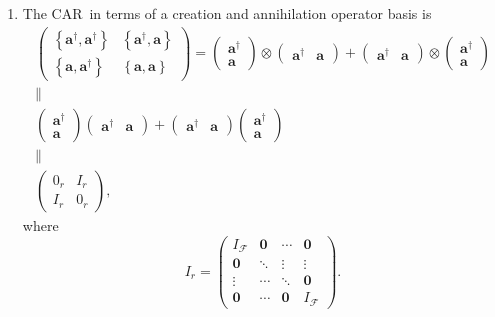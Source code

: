 \documentclass[aps,preprint]{revtex4}
\begin{document}
\begin{enumerate}
\begin{enumerate}
\item The CAR\ in terms of a creation and annihilation operator basis is 
\begin{gather}
\left( 
\begin{array}{cc}
\left\{ \boldsymbol{a}^{\dagger },\boldsymbol{a}^{\dagger }\right\} & 
\left\{ \boldsymbol{a}^{\dagger },\boldsymbol{a}\right\} \\ 
\left\{ \boldsymbol{a},\boldsymbol{a}^{\dagger }\right\} & \left\{ 
\boldsymbol{a},\boldsymbol{a}\right\}%
\end{array}%
\right) =\left( 
\begin{array}{c}
\boldsymbol{a}^{\dagger } \\ 
\boldsymbol{a}%
\end{array}%
\right) \otimes \left( 
\begin{array}{cc}
\boldsymbol{a}^{\dagger } & \boldsymbol{a}%
\end{array}%
\right) +\left( 
\begin{array}{cc}
\boldsymbol{a}^{\dagger } & \boldsymbol{a}%
\end{array}%
\right) \otimes \left( 
\begin{array}{c}
\boldsymbol{a}^{\dagger } \\ 
\boldsymbol{a}%
\end{array}%
\right) \\
\parallel \\
\left( 
\begin{array}{c}
\boldsymbol{a}^{\dagger } \\ 
\boldsymbol{a}%
\end{array}%
\right) \left( 
\begin{array}{cc}
\boldsymbol{a}^{\dagger } & \boldsymbol{a}%
\end{array}%
\right) +\left( 
\begin{array}{cc}
\boldsymbol{a}^{\dagger } & \boldsymbol{a}%
\end{array}%
\right) \left( 
\begin{array}{c}
\boldsymbol{a}^{\dagger } \\ 
\boldsymbol{a}%
\end{array}%
\right) \\
\parallel \\
\left( 
\begin{array}{cc}
0_{r} & I_{r} \\ 
I_{r} & 0_{r}%
\end{array}%
\right) ,
\end{gather}%
where 
\begin{equation}
I_{r}=\left( 
\begin{array}{cccc}
I_{\mathcal{F}} & \boldsymbol{0} & \cdots & \boldsymbol{0} \\ 
\boldsymbol{0} & \ddots & \vdots & \vdots \\ 
\vdots & \cdots & \ddots & \boldsymbol{0} \\ 
\boldsymbol{0} & \cdots & \boldsymbol{0} & I_{\mathcal{F}}%
\end{array}%
\right) .
\end{equation}


\end{enumerate}
\end{enumerate}
\end{document}
